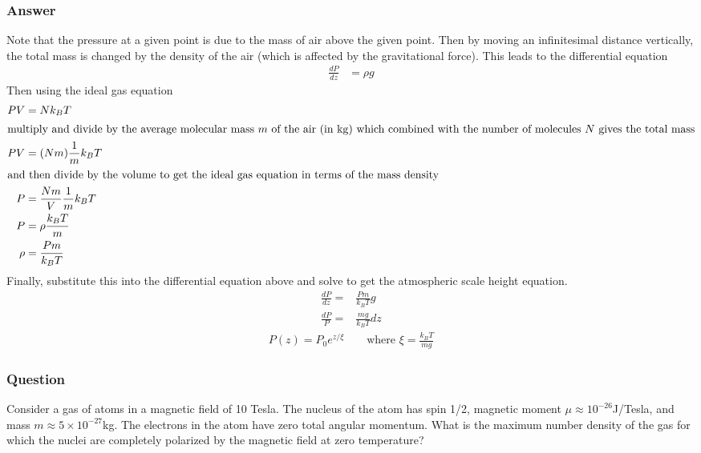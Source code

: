 \subsubsection{Answer}
Note that the pressure at a given point is due to the mass of air above the
given point. Then by moving an infinitesimal distance vertically, the total
mass is changed by the density of the air (which is affected by the
gravitational force). This leads to the differential equation
\begin{align*}
	\frac{dP}{dz} &= \rho g
\end{align*}
Then using the ideal gas equation
\begin{align*}
	PV &= N k_B T \\
\intertext{multiply and divide by the average molecular mass $m$ of the air (in
\si{\kg}) which combined with the number of molecules $N$ gives the total mass}
	PV &= (Nm) \frac{1}{m} k_B T \\
\intertext{and then divide by the volume to get the ideal gas equation in terms
of the mass density}
	P &= \frac{Nm}{V} \frac{1}{m} k_B T \\
	P &= \rho  \frac{k_B T}{m} \\
	\rho  &= \frac{P m}{k_B T}
\end{align*}
Finally, substitute this into the differential equation above and solve to
get the atmospheric scale height equation.
\begin{align*}
	\frac{dP}{dz} ={}& \frac{P m}{k_B T}g \\
	\frac{dP}{P} ={}& \frac{mg}{k_B T} dz
\end{align*}
\begin{align}
	\boxed{
	P(z) = P_0 e^{z/{\xi}}
		\quad\quad\text{where }{\xi} = \frac{k_B T}{mg}
	}
\end{align}


\subsubsection{Question}

Consider a gas of atoms in a magnetic field of 10 Tesla. The nucleus of the atom has spin 1/2, magnetic moment $\mu\approx10^{-26}$J/Tesla, and mass $m\approx5\times10^{-27}$kg. The electrons in the atom have zero total angular momentum. What is the maximum number density of the gas for which the nuclei are completely polarized by the magnetic field at zero temperature?

